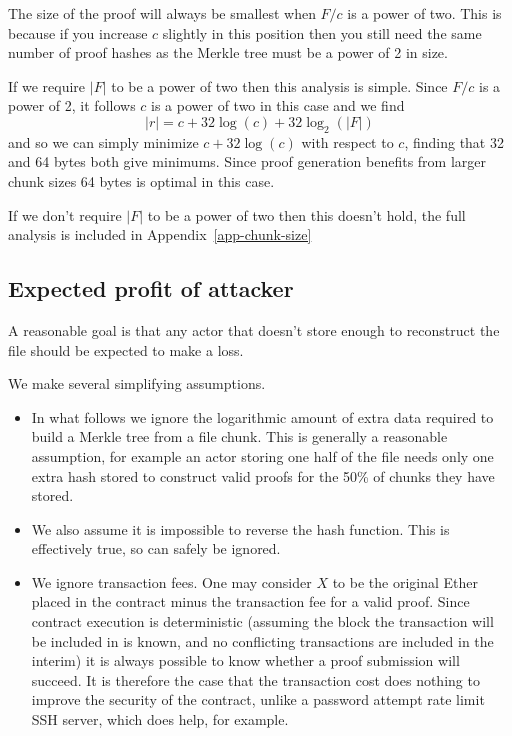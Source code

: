 \documentclass[10pt,twoside,a4paper]{article}
\begin{document}
The size of the proof will always be smallest when $F/c$ is a power of two.
This is because if you increase $c$ slightly in this position then you still need the same number of proof hashes as the Merkle tree must be a power of 2 in size.


If we require $|F|$ to be a power of two then this analysis is simple.
Since $F/c$ is a power of 2, it follows $c$ is a power of two in this case and we find
\[|r| = c + 32\log(c) + 32\log_2(|F|)\]
and so we can simply minimize $c + 32\log(c)$ with respect to $c$, finding that 32 and 64 bytes both give minimums.
Since proof generation benefits from larger chunk sizes 64 bytes is optimal in this case.

If we don't require $|F|$ to be a power of two then this doesn't hold, the full analysis is included in Appendix~\ref{app-chunk-size}

\subsection{Expected profit of attacker}

A reasonable goal is that any actor that doesn't store enough to reconstruct the file should be expected to make a loss.

We make several simplifying assumptions.
\begin{itemize}
\item In what follows we ignore the logarithmic amount of extra data required to build a Merkle tree from a file chunk.
This is generally a reasonable assumption, for example an actor storing one half of the file needs only one extra hash stored to
construct valid proofs for the 50\% of chunks they have stored.

\item We also assume it is impossible to reverse the hash function.
This is effectively true, so can safely be ignored.

\item We ignore transaction fees. One may consider $X$ to be the original Ether placed in the contract minus the transaction fee for a valid proof.
Since contract execution is deterministic (assuming the block the transaction will be included in is known, and no conflicting transactions are included in the interim) it is 
always possible to know whether a proof submission will succeed. It is therefore the case that the transaction cost does nothing to improve the
security of the contract, unlike a password attempt rate limit SSH server, which does help, for example.
\end{itemize}
\end{document}
